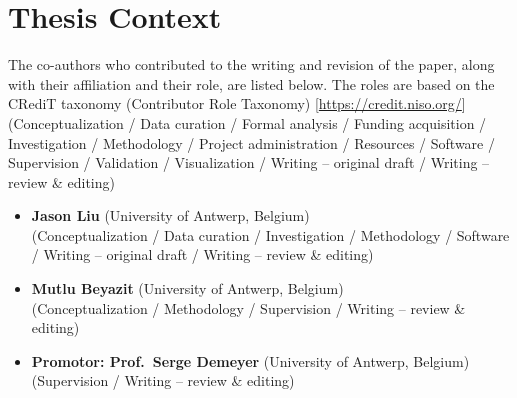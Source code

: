 
\section*{Thesis Context}

%
%

%
The co-authors who contributed to the writing and revision of the paper, along with their affiliation and their role, are listed below.
The roles are based on the CRediT taxonomy (Contributor Role Taxonomy) [\url{https://credit.niso.org/}]
(Conceptualization / Data curation / Formal analysis / Funding acquisition / Investigation /
Methodology / Project administration / Resources / Software / Supervision / Validation /
Visualization / Writing -- original draft / Writing -- review \& editing)

\begin{itemize}
  \item \textbf{Jason Liu} (University of Antwerp, Belgium)\\
    (Conceptualization / Data curation / Investigation / Methodology / Software /
     Writing -- original draft / Writing -- review \& editing)
  \item \textbf{Mutlu Beyazit} (University of Antwerp, Belgium)\\
    (Conceptualization / Methodology / Supervision / Writing -- review \& editing)
  \item \textbf{Promotor: Prof.\ Serge Demeyer} (University of Antwerp, Belgium)\\
    (Supervision / Writing -- review \& editing)
\end{itemize}
